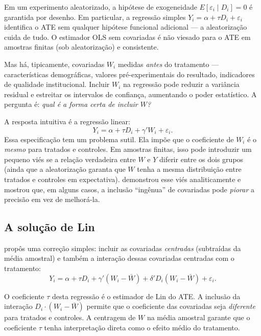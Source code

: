 Em um experimento aleatorizado, a hipótese de exogeneidade $E[\varepsilon_i \mid D_i] = 0$ é garantida por desenho. Em particular, a regressão simples $Y_i = \alpha + \tau D_i + \varepsilon_i$ identifica o ATE sem qualquer hipótese funcional adicional --- a aleatorização cuida de tudo. O estimador OLS sem covariadas é não viesado para o ATE em amostras finitas (sob aleatorização) e consistente.

Mas há, tipicamente, covariadas $W_i$ medidas \textit{antes} do tratamento --- características demográficas, valores pré-experimentais do resultado, indicadores de qualidade institucional. Incluir $W_i$ na regressão pode reduzir a variância residual e estreitar os intervalos de confiança, aumentando o poder estatístico. A pergunta é: \textit{qual é a forma certa de incluir $W$?}

A resposta intuitiva é a regressão linear:
\begin{equation}
Y_i = \alpha + \tau D_i + \gamma' W_i + \varepsilon_i.
\label{eq:ols-com-w}
\end{equation}
Essa especificação tem um problema sutil. Ela impõe que o coeficiente de $W_i$ é o \textit{mesmo} para tratados e controles. Em amostras finitas, isso pode introduzir um pequeno viés se a relação verdadeira entre $W$ e $Y$ diferir entre os dois grupos (ainda que a aleatorização garanta que $W$ tenha a mesma distribuição entre tratados e controles em expectativa). \citet{freedman2008} demonstrou esse viés analiticamente e mostrou que, em alguns casos, a inclusão ``ingênua'' de covariadas pode \textit{piorar} a precisão em vez de melhorá-la.

\subsection*{A solução de Lin}

\citet{Lin2013} propôs uma correção simples: incluir as covariadas \textit{centradas} (subtraídas da média amostral) e também a interação dessas covariadas centradas com o tratamento:
\begin{equation}
Y_i = \alpha + \tau D_i + \gamma' (W_i - \bar{W}) + \delta' D_i (W_i - \bar{W}) + \varepsilon_i.
\label{eq:lin}
\end{equation}

O coeficiente $\tau$ desta regressão é o estimador de Lin do ATE. A inclusão da interação $D_i \cdot (W_i - \bar{W})$ permite que o coeficiente das covariadas seja \textit{diferente} para tratados e controles. A centragem de $W$ na média amostral garante que o coeficiente $\tau$ tenha interpretação direta como o efeito médio do tratamento.


